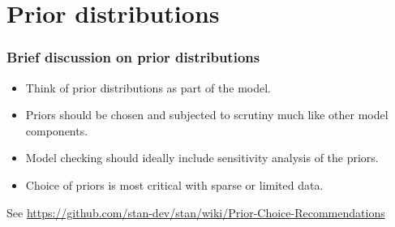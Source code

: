\documentclass{beamer}
\begin{document}


\section{Prior distributions}

\begin{frame}
  \frametitle{Brief discussion on prior distributions}

  \begin{itemize}
  \item<1-> Think of prior distributions as part of the model.
  \item<2-> Priors should be chosen and 
  subjected to scrutiny much like other model components.
  \item<3-> Model checking should ideally include sensitivity analysis of
    the priors.
  \item<4-> Choice of priors is most critical with sparse or limited data.
  \end{itemize}

See \url{https://github.com/stan-dev/stan/wiki/Prior-Choice-Recommendations}

\end{frame}
\end{document}
